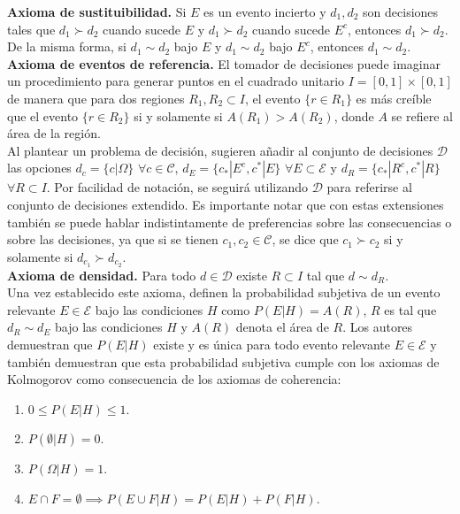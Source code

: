\documentclass[11pt,a4paper]{article}
\begin{document}
\textbf{Axioma de sustituibilidad.} Si $E$ es un evento incierto y $d_1, d_2$ son decisiones tales que $d_1 \succ d_2$ cuando sucede $E$ y $d_1 \succ d_2$ cuando sucede $E^c$, entonces $d_1 \succ d_2$. De la misma forma, si $d_1 \sim d_2$ bajo $E$ y $d_1 \sim d_2$ bajo $E^c$, entonces $d_1 \sim d_2$.\\

\textbf{Axioma de eventos de referencia.} El tomador de decisiones puede imaginar un procedimiento para generar puntos en el cuadrado unitario $I = [0, 1] \times [0, 1]$ de manera que para dos regiones $R_1, R_2 \subset I$, el evento $\lbrace r \in R_1\rbrace$ es más creíble que el evento $\lbrace r \in R_2 \rbrace$ si y solamente si $A(R_1) > A(R_2)$, donde $A$ se refiere al área de la región.\\

Al plantear un problema de decisión, \citet{mendoza} sugieren añadir al conjunto de decisiones $\mathcal{D}$ las opciones $d_c = \lbrace c|\Omega\rbrace$ $\forall c \in \mathcal{C}$, $d_E = \lbrace c_* | E^c, c^* | E \rbrace$ $\forall E \subset \mathcal{E}$ y $d_R = \lbrace c_*|R^c, c^* | R\rbrace$ $\forall R \subset I$.  Por facilidad de notación, se seguirá utilizando $\mathcal{D}$ para referirse al conjunto de decisiones extendido. Es importante notar que con estas extensiones también se puede hablar indistintamente de preferencias sobre las consecuencias o sobre las decisiones, ya que si se tienen $c_1, c_2 \in \mathcal{C}$, se dice que $c_1 \succ c_2$ si y solamente si $d_{c_1} \succ d_{c_2}$.\\

\textbf{Axioma de densidad.} Para todo $d \in \mathcal{D}$ existe $R \subset I$ tal que $d \sim d_R$.\\

Una vez establecido este axioma, \citet{mendoza} definen la probabilidad subjetiva de un evento relevante $E \in \mathcal{E}$ bajo las condiciones $H$ como $P(E|H) = A(R)$, $R$ es tal que $d_R \sim d_E$ bajo las condiciones $H$ y $A(R)$ denota el área de $R$. Los autores demuestran que $P(E|H)$ existe y es única para todo evento relevante $E \in \mathcal{E}$ y también demuestran que esta probabilidad subjetiva cumple con los axiomas de Kolmogorov como consecuencia de los axiomas de coherencia:
\begin{enumerate}
\item $0 \leq P(E|H) \leq 1$.
\item $P(\emptyset|H) = 0$.
\item $P(\Omega | H) = 1$.
\item $E\cap F = \emptyset \implies P(E\cup F|H) = P(E|H) + P(F|H)$.
\end{enumerate}
\end{document}
